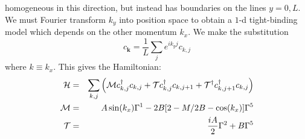 \documentclass{article}
\begin{document}
homogeneous in this direction, but instead has boundaries on the
lines $y=0,L.$ We must Fourier transform $k_y$ into position space
to obtain a $1$-d tight-binding model which depends on the other
momentum $k_x.$ We make the substitution\begin{equation}
c_{\textbf{k}}=\frac{1}{L}\sum_{j}e^{i k_y j}c_{k,j}
\end{equation}\noindent where $k\equiv k_x.$ This
gives the Hamiltonian:
\begin{eqnarray}
{\cal{H}}&=&\sum_{k,j}\left({\cal{M}}c^{\dagger}_{k,j}c_{k,j}+{\cal{T}}c^{\dagger}_{k,j}c_{k,j+1}+
{\cal{T}}^{\dagger}
c^{\dagger}_{k,j+1}c_{k,j}\right)\\
{\cal{M}}&=&A \sin (k_x)\Gamma^1 -2B[2-M/2B-\cos
(k_x)]\Gamma^5\\
{\cal{T}}&=&\frac{i A}{2}\Gamma^2+B\Gamma^5
\end{eqnarray}
\end{document}
